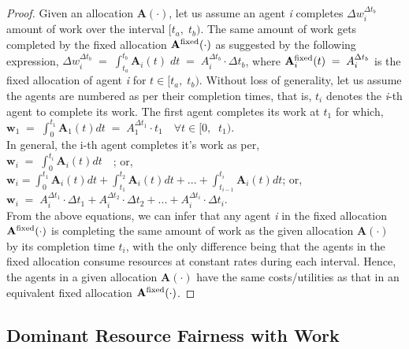\documentclass[letterpaper]{article} %
\theoremstyle{definition}
\begin{document}
\begin{proof}
Given an allocation $\mathbf{A}(\cdot)$, let us assume an agent \textit{i} completes $\Delta w^{\Delta t_{b}}_{i}$ amount of work over the interval $[t_{a}, \; t_{b})$. The same amount of work gets completed by the fixed allocation $\mathbf{A}^{\textnormal{fixed}}(\cdot)$ as suggested by the following expression, 
$\Delta w^{\Delta t_{b}}_{i} \; = \; \int_{t_{a}}^{t_{b}} \mathbf{A}_{i}(t)\;dt \; =\;  A^{\Delta t_{b}}_{i} \cdot \Delta t_{b}$, where $\mathbf{A}^{\textnormal{fixed}}_{i}(t) \; = \; A^{\Delta t_{b}}_{i}$  is the fixed allocation of agent \textit{i} for $t \in [t_{a}, \; t_{b})$. Without loss of generality, let us assume the agents are numbered as per their completion times, that is, $t_{i}$ denotes the \textit{i}-th agent to complete its work. The first agent completes its work at $t_{1}$ for which,\\[2 pt] 
$\mathbf{w}_{1} \; = \; \displaystyle \int_{0}^{t_{1}} \mathbf{A}_{1}(t) dt\; = \; A^{\Delta t_{1}}_{1} \cdot t_{1} \quad \forall t \in [0, \;\; t_{1})$.\\[2 pt]

\noindent In general, the i-th agent completes it's work as per,\\[4 pt]
$\mathbf{w}_{i} \; = \; \displaystyle \int_{0}^{t_{i}} \mathbf{A}_{i}(t) dt \quad$; or, \\[4 pt]
$\mathbf{w}_{i} = \displaystyle \int_{0}^{t_{1}} \mathbf{A}_{i}(t) dt + \int_{t_{1}}^{t_{2}} \mathbf{A}_{i}(t) dt + ... +\int_{t_{i-1}}^{t_{i}} \mathbf{A}_{i}(t) dt$; or,\\[4 pt]     
$\mathbf{w}_{i} \; = \; A^{\Delta t_{1}}_{i} \cdot \Delta t_{1} + A^{\Delta t_{2}}_{i} \cdot \Delta t_{2} + ... + A^{\Delta t_{i}}_{i} \cdot \Delta t_{i}$.\\[4 pt]

\noindent From the above equations, we can infer that any agent \textit{i} in the fixed allocation $\mathbf{A}^{\textnormal{fixed}}(\cdot)$ is completing the same amount of work as the given allocation $\mathbf{A}(\cdot)$ by its completion time $t_{i}$, with the only difference being that the agents in the fixed allocation consume resources at constant rates during each interval. Hence, the agents in a given allocation $\mathbf{A}(\cdot)$ have the same costs/utilities as that in an equivalent fixed allocation $\mathbf{A}^{\textnormal{fixed}}(\cdot)$.
\end{proof}

\subsection{Dominant Resource Fairness with Work}
\end{document}
